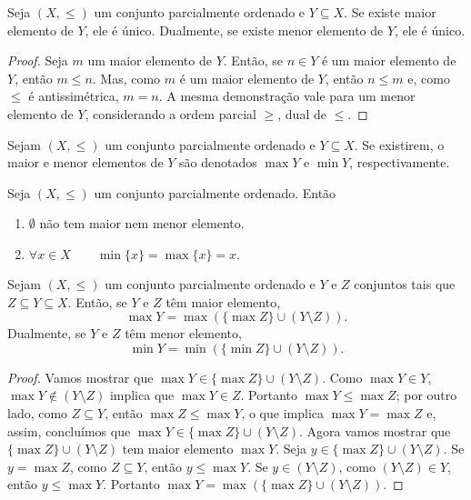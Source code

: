 \begin{proposition}
	Seja $(X,\leq)$ um conjunto parcialmente ordenado e $Y \subseteq X$. Se existe maior elemento de $Y$, ele é único. Dualmente, se existe menor elemento de $Y$, ele é único.
\end{proposition}
\begin{proof}
	Seja $m$ um maior elemento de $Y$. Então, se $n \in Y$ é um maior elemento de $Y$, então $m \leq n$. Mas, como $m$ é um maior elemento de $Y$, então $n \leq m$ e, como $\leq$ é antissimétrica, $m=n$. A mesma demonstração vale para um menor elemento de $Y$, considerando a ordem parcial $\geq$, dual de $\leq$.
\end{proof}

\begin{notation}
	Sejam $(X,\leq)$ um conjunto parcialmente ordenado e $Y \subseteq X$. Se existirem, o maior e menor elementos de $Y$ são denotados $\max Y$ e $\min Y$, respectivamente.
\end{notation}

\begin{proposition}
	Seja $(X,\leq)$ um conjunto parcialmente ordenado. Então
	\begin{enumerate}
	\item $\emptyset$ não tem maior  nem menor elemento.
	\item $\forall x \in X \qquad \min\{x\}=\max\{x\} = x.$
	\end{enumerate}
\end{proposition}

\begin{proposition}
	Sejam $(X,\leq)$ um conjunto parcialmente ordenado e $Y$ e $Z$ conjuntos tais que $Z \subseteq Y \subseteq X$. Então, se $Y$ e $Z$ têm maior elemento,
	\begin{equation*}
	\max Y = \max(\{\max Z\} \cup (Y \setminus Z)).
	\end{equation*}
Dualmente, se $Y$ e $Z$ têm menor elemento,
	\begin{equation*}
	\min Y = \min(\{\min Z\} \cup (Y \setminus Z)).
	\end{equation*}
\end{proposition}
\begin{proof}
	Vamos mostrar que $\max Y \in \{\max Z\} \cup (Y \setminus Z)$. Como $\max Y \in Y$, $\max Y \notin (Y \setminus Z)$ implica que $\max Y \in Z$. Portanto $\max Y \leq \max Z$; por outro lado, como $Z \subseteq Y$, então $\max Z \leq \max Y$, o que implica $\max Y = \max Z$ e, assim, concluímos que $\max Y \in \{\max Z\} \cup (Y \setminus Z)$. Agora vamos mostrar que $\{\max Z\} \cup (Y \setminus Z)$ tem maior elemento $\max Y$. Seja $y \in \{\max Z\} \cup (Y \setminus Z)$. Se $y = \max Z$, como $Z \subseteq Y$, então $y \leq \max Y$. Se $y \in (Y \setminus Z)$, como $(Y \setminus Z) \in Y$, então $y \leq \max Y$. Portanto $\max Y = \max(\{\max Z\} \cup (Y \setminus Z))$.
\end{proof}

